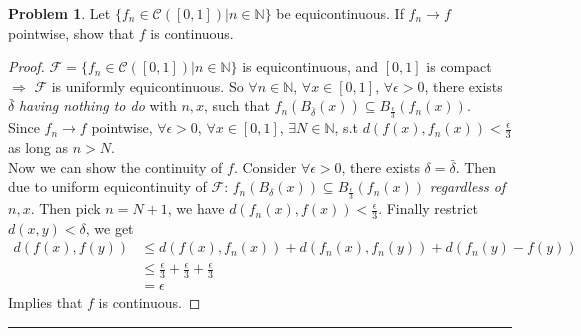\documentclass[a4paper, 10pt]{article}
\theoremstyle{definition}
\newtheorem{problem}{Problem}
\theoremstyle{hSol}
\begin{document}
\begin{problem} Let $\{f_n \in \mathcal{C}([0,1]) | n\in \mathbb{N}\}$ be equicontinuous. If $f_n \to f$ pointwise, show that $f$ is continuous.
\end{problem}
\begin{proof} $\mathcal{F}=\{f_n \in \mathcal{C}([0,1]) | n\in \mathbb{N}\}$ is equicontinuous, and $[0,1]$ is compact $\Rightarrow$ $\mathcal{F}$ is uniformly equicontinuous. So $\forall n\in \mathbb{N}$, $\forall x\in [0,1]$, $\forall \epsilon >0$, there exists $\bar{\delta}$ \textit{having nothing to do} with $n, x$, such that $f_n(B_{\bar{\delta}}(x)) \subseteq B_{\frac{\epsilon}{3}}(f_n(x))$.\\
Since $f_n \to f$ pointwise, $\forall \epsilon>0$, $\forall x\in [0,1]$, $\exists N\in \mathbb{N}$, s.t $d(f(x),f_n(x))<\frac{\epsilon}{3}$ as long as $n>N$.\\ 
Now we can show the continuity of $f$. Consider $\forall \epsilon>0$, there exists $\delta=\bar{\delta}$. Then due to uniform equicontinuity of $\mathcal{F}$: $f_n(B_{\delta}(x)) \subseteq B_{\frac{\epsilon}{3}}(f_n(x))$ \textit{regardless of} $n,x$. Then pick $n=N+1$, we have $d(f_n(x),f(x))<\frac{\epsilon}{3}$. Finally restrict $d(x,y)<\delta$, we get
\begin{equation}
  \begin{split}
    d(f(x),f(y)) &\leq d(f(x),f_n(x))+d(f_n(x),f_n(y))+d(f_n(y)-f(y)) \\
    & \leq \frac{\epsilon}{3} + \frac{\epsilon}{3} + \frac{\epsilon}{3} \\
    &= \epsilon
  \end{split}
\end{equation}
Implies that $f$ is continuous.
\end{proof}

\noindent\rule{16cm}{0.4pt}
\end{document}
